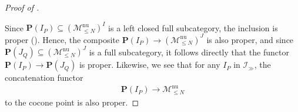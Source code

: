 \documentclass[12pt, reqno]{amsart}
\theoremstyle{plain}
\theoremstyle{definition}
\begin{document}
\begin{proof}[Proof of ]
\begin{center}
\end{center}
Since $\mathbf{P}(I_P)\subseteq (\mathscr{M}_{\leq N}^{\operatorname{nu}})^I$ is a left closed full subcategory, the inclusion is proper (\cite[Example 2.24 (3)]{ClausenOrsnesJansen}). Hence, the composite $\mathbf{P}(I_P)\rightarrow (\mathscr{M}_{\leq N}^{\operatorname{nu}})^J$ is also proper, and since $\mathbf{P}(J_Q)\subseteq (\mathscr{M}_{\leq N}^{\operatorname{nu}})^J$ is a full subcategory, it follows directly that the functor $\mathbf{P}(I_P) \rightarrow \mathbf{P}(J_Q)$ is proper. Likewise, we see that for any $I_P$ in $\mathcal{I}_\gg$, the concatenation functor
\begin{align*}
\mathbf{P}(I_P)\rightarrow \mathscr{M}_{\leq N}^{\operatorname{nu}}
\end{align*}
to the cocone point is also proper.


\end{proof}
\end{document}

